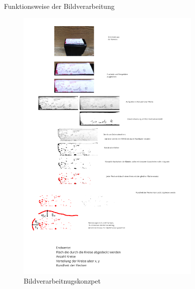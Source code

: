 Funktionsweise der Bildverarbeitung

\begin{figure}
    \centering
    \includegraphics[width=0.8\textwidth]{Bilder/Screenshotfrom2024-04-0112-59-42.png}
    \caption{Bildverarbeitnugskonzpet}
    \label{fig:Bildverarbeitnugskonzpet}
\end{figure}

\newpage
